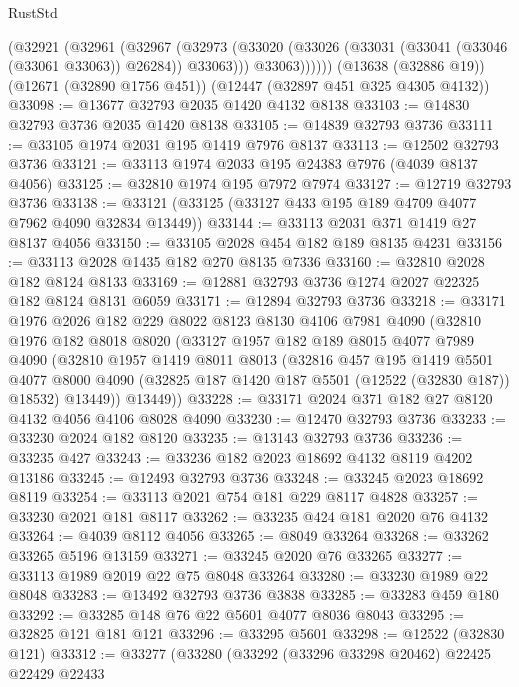 \begin{lexlean}{RustStd}
\begin{coremodule}
          (@32921
            (@32961
              (@32967
                (@32973 (@33020 (@33026 (@33031 (@33041 (@33046 (@33061 @33063)) @26284)) @33063)))
                @33063))))))
    (@13638 (@32886 @19))
    (@12671 (@32890 @1756 @451))
    (@12447 (@32897 @451 @325 @4305 @4132))
@33098 := @13677 @32793 @2035 @1420 @4132 @8138
@33103 := @14830 @32793 @3736 @2035 @1420 @8138
@33105 := @14839 @32793 @3736
@33111 := @33105 @1974 @2031 @195 @1419 @7976 @8137
@33113 := @12502 @32793 @3736
@33121 := @33113 @1974 @2033 @195 @24383 @7976 (@4039 @8137 @4056)
@33125 := @32810 @1974 @195 @7972 @7974
@33127 := @12719 @32793 @3736
@33138 := @33121 (@33125 (@33127 @433 @195 @189 @4709 @4077 @7962 @4090 @32834 @13449))
@33144 := @33113 @2031 @371 @1419 @27 @8137 @4056
@33150 := @33105 @2028 @454 @182 @189 @8135 @4231
@33156 := @33113 @2028 @1435 @182 @270 @8135 @7336
@33160 := @32810 @2028 @182 @8124 @8133
@33169 := @12881 @32793 @3736 @1274 @2027 @22325 @182 @8124 @8131 @6059
@33171 := @12894 @32793 @3736
@33218 := @33171
    @1976
    @2026
    @182
    @229
    @8022
    @8123
    @8130
    @4106
    @7981
    @4090
    (@32810
      @1976
      @182
      @8018
      @8020
      (@33127
        @1957
        @182
        @189
        @8015
        @4077
        @7989
        @4090
        (@32810
          @1957
          @1419
          @8011
          @8013
          (@32816
            @457
            @195
            @1419
            @5501
            @4077
            @8000
            @4090
            (@32825 @187 @1420 @187 @5501 (@12522 (@32830 @187)) @18532)
            @13449))
        @13449))
@33228 := @33171 @2024 @371 @182 @27 @8120 @4132 @4056 @4106 @8028 @4090
@33230 := @12470 @32793 @3736
@33233 := @33230 @2024 @182 @8120
@33235 := @13143 @32793 @3736
@33236 := @33235 @427
@33243 := @33236 @182 @2023 @18692 @4132 @8119 @4202 @13186
@33245 := @12493 @32793 @3736
@33248 := @33245 @2023 @18692 @8119
@33254 := @33113 @2021 @754 @181 @229 @8117 @4828
@33257 := @33230 @2021 @181 @8117
@33262 := @33235 @424 @181 @2020 @76 @4132
@33264 := @4039 @8112 @4056
@33265 := @8049 @33264
@33268 := @33262 @33265 @5196 @13159
@33271 := @33245 @2020 @76 @33265
@33277 := @33113 @1989 @2019 @22 @75 @8048 @33264
@33280 := @33230 @1989 @22 @8048
@33283 := @13492 @32793 @3736 @3838
@33285 := @33283 @459 @180
@33292 := @33285 @148 @76 @22 @5601 @4077 @8036 @8043
@33295 := @32825 @121 @181 @121
@33296 := @33295 @5601
@33298 := @12522 (@32830 @121)
@33312 := @33277
    (@33280
      (@33292
        (@33296 @33298 @20462)
        @22425
        @22429
        @22433

\end{coremodule}
\end{lexlean}
